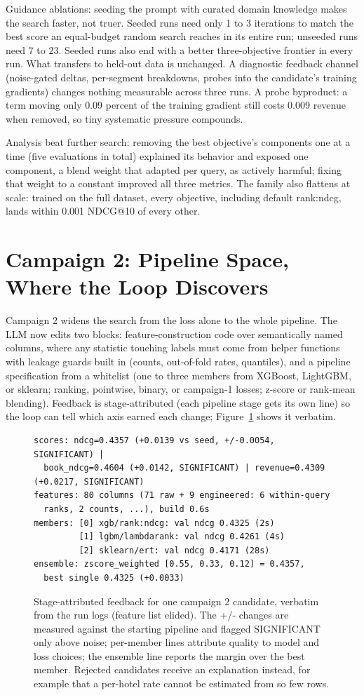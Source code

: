 \documentclass[]{ceurart}
\begin{document}
Guidance ablations: seeding the prompt with curated domain knowledge makes
the search faster, not truer. Seeded runs need only 1 to 3 iterations to
match the best score an equal-budget random search reaches in its entire
run; unseeded runs need 7 to 23. Seeded runs also end with a better three-objective frontier in every run. What transfers
to held-out data is unchanged. A diagnostic feedback channel (noise-gated deltas, per-segment breakdowns,
probes into the candidate's training gradients) changes nothing measurable across three runs. A probe byproduct: a term moving only 0.09 percent of the training
gradient still costs 0.009 revenue when removed, so tiny systematic
pressure compounds.

Analysis beat further search: removing the best objective's components one
at a time (five evaluations in total) explained its behavior and exposed one
component, a blend weight that adapted per query, as actively harmful;
fixing that weight to a constant improved all three metrics. The family also
flattens at scale: trained on the full dataset, every objective, including
default rank:ndcg, lands within 0.001 NDCG@10 of every other.

\section{Campaign 2: Pipeline Space, Where the Loop Discovers}
Campaign 2 widens the search from the loss alone to the whole pipeline.
The LLM now edits two blocks: feature-construction code over semantically
named columns, where any statistic touching labels must come from helper
functions with leakage guards built in (counts, out-of-fold rates,
quantiles), and a pipeline specification from a whitelist (one to three members from XGBoost, LightGBM, or sklearn; ranking,
pointwise, binary, or campaign-1 losses; z-score or rank-mean blending). Feedback is stage-attributed (each pipeline stage gets its own line) so
the loop can tell which axis earned each change; Figure~\ref{fig:feedback} shows it verbatim.

\begin{figure}
\footnotesize
\begin{verbatim}
scores: ndcg=0.4357 (+0.0139 vs seed, +/-0.0054, SIGNIFICANT) |
  book_ndcg=0.4604 (+0.0142, SIGNIFICANT) | revenue=0.4309 (+0.0217, SIGNIFICANT)
features: 80 columns (71 raw + 9 engineered: 6 within-query
  ranks, 2 counts, ...), build 0.6s
members: [0] xgb/rank:ndcg: val ndcg 0.4325 (2s)
         [1] lgbm/lambdarank: val ndcg 0.4261 (4s)
         [2] sklearn/ert: val ndcg 0.4171 (28s)
ensemble: zscore_weighted [0.55, 0.33, 0.12] = 0.4357,
  best single 0.4325 (+0.0033)
\end{verbatim}
\caption{Stage-attributed feedback for one campaign 2 candidate, verbatim
from the run logs (feature list elided). The +/- changes are measured
against the starting pipeline and flagged SIGNIFICANT only above noise;
per-member lines attribute quality to model and loss choices; the ensemble
line reports the margin over the best member. Rejected candidates receive
an explanation instead, for example that a per-hotel rate cannot be
estimated from so few rows.}
\label{fig:feedback}
\end{figure}
\end{document}
